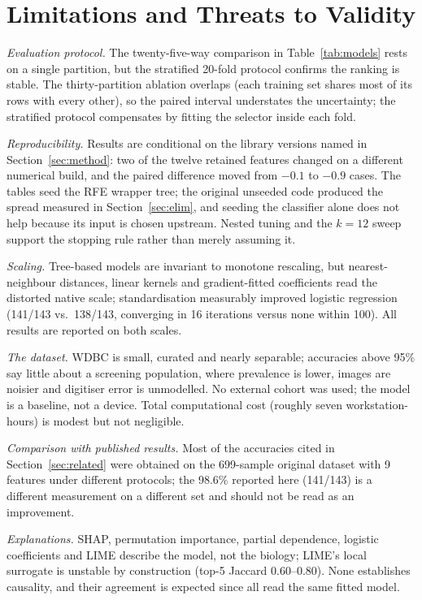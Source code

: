 \documentclass[review,12pt]{elsarticle}
\begin{document}
\section{Limitations and Threats to Validity}
\label{sec:limits}

\emph{Evaluation protocol.} The twenty-five-way comparison in Table~\ref{tab:models} rests on a single partition, but the stratified 20-fold protocol confirms the ranking is stable. The thirty-partition ablation overlaps (each training set shares most of its rows with every other), so the paired interval understates the uncertainty; the stratified protocol compensates by fitting the selector inside each fold.

\emph{Reproducibility.} Results are conditional on the library versions named in Section~\ref{sec:method}: two of the twelve retained features changed on a different numerical build, and the paired difference moved from $-0.1$ to $-0.9$ cases. The tables seed the RFE wrapper tree; the original unseeded code produced the spread measured in Section~\ref{sec:elim}, and seeding the classifier alone does not help because its input is chosen upstream. Nested tuning and the $k=12$ sweep support the stopping rule rather than merely assuming it.

\emph{Scaling.} Tree-based models are invariant to monotone rescaling, but nearest-neighbour distances, linear kernels and gradient-fitted coefficients read the distorted native scale; standardisation measurably improved logistic regression (141/143 vs.\ 138/143, converging in 16 iterations versus none within 100). All results are reported on both scales.

\emph{The dataset.} WDBC is small, curated and nearly separable; accuracies above 95\% say little about a screening population, where prevalence is lower, images are noisier and digitiser error is unmodelled. No external cohort was used; the model is a baseline, not a device. Total computational cost (roughly seven workstation-hours) is modest but not negligible.

\emph{Comparison with published results.} Most of the accuracies cited in Section~\ref{sec:related} were obtained on the 699-sample original dataset with 9 features under different protocols; the 98.6\% reported here (141/143) is a different measurement on a different set and should not be read as an improvement.

\emph{Explanations.} SHAP, permutation importance, partial dependence, logistic coefficients and LIME describe the model, not the biology; LIME's local surrogate is unstable by construction (top-5 Jaccard 0.60--0.80). None establishes causality, and their agreement is expected since all read the same fitted model.
\end{document}
